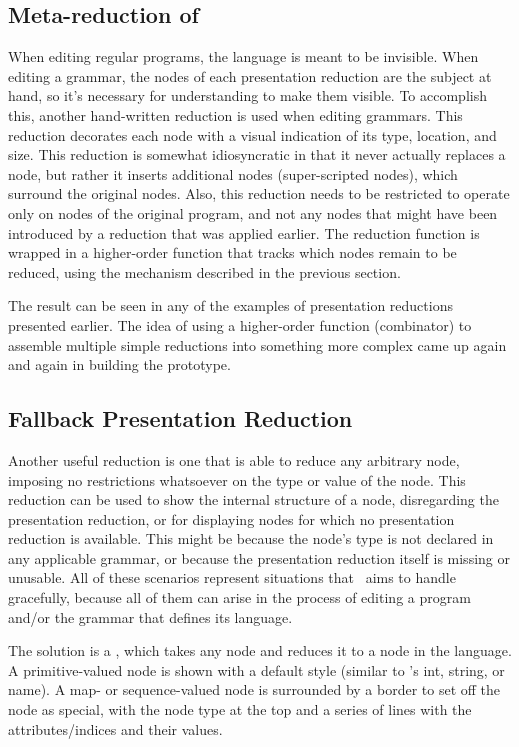\subsection{Meta-reduction of \textit{}}
When editing regular programs, the  language is meant to be invisible. When editing a grammar, the  nodes of each presentation reduction are the subject at hand, so it's necessary for understanding to make them visible. To accomplish this, another hand-written reduction is used when editing grammars. This reduction decorates each node with a visual indication of its type, location, and size. This reduction is somewhat idiosyncratic in that it never actually replaces a node, but rather it inserts additional nodes (super-scripted  nodes), which surround the original nodes. Also, this reduction needs to be restricted to operate only on  nodes of the original program, and not any nodes that might have been introduced by a reduction that was applied earlier. The reduction function is wrapped in a higher-order function that tracks which nodes remain to be reduced, using the mechanism described in the previous section.

The result can be seen in any of the examples of presentation reductions presented earlier. The idea of using a higher-order function (combinator) to assemble multiple simple reductions into something more complex came up again and again in building the prototype.


\subsection{Fallback Presentation Reduction}
Another useful reduction is one that is able to reduce any arbitrary node, imposing no restrictions whatsoever on the type or value of the node. This reduction can be used to show the internal structure of a node, disregarding the presentation reduction, or for displaying nodes for which no presentation reduction is available. This might be because the node's type is not declared in any applicable grammar, or because the presentation reduction itself is missing or unusable. All of these scenarios represent situations that \Meta\ aims to handle gracefully, because all of them can arise in the process of editing a program and/or the grammar that defines its language.

The solution is a , which takes any node and reduces it to a node in the  language. A primitive-valued node is shown with a default style (similar to 's int, string, or name). A map- or sequence-valued node is surrounded by a border to set off the node as special, with the node type at the top and a series of lines with the attributes/indices and their values.

